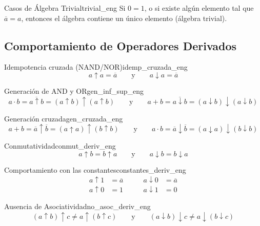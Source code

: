\setcounter{tcb@cnt@teorema}{3}
\begin{teorema}{Casos de Álgebra Trivial}{trivial_eng}
Si $0 = 1$, o si existe algún elemento tal que $\overline{a} = a$, entonces el álgebra contiene un único elemento (álgebra trivial).
\end{teorema}

\subsection*{Comportamiento de Operadores Derivados}

\setcounter{tcb@cnt@teorema}{13}
\begin{teorema}{Idempotencia cruzada (NAND/NOR)}{idemp_cruzada_eng}
\[ a \uparrow a = \overline{a} \qquad \text{y} \qquad a \downarrow a = \overline{a} \]
\end{teorema}

\setcounter{tcb@cnt@teorema}{14}
\begin{teorema}{Generación de AND y OR}{gen_inf_sup_eng}
\[ a \cdot b = \overline{a \uparrow b} = (a \uparrow b) \uparrow (a \uparrow b) \qquad \text{y} \qquad a + b = \overline{a \downarrow b} = (a \downarrow b) \downarrow (a \downarrow b) \]
\end{teorema}

\setcounter{tcb@cnt@teorema}{15}
\begin{teorema}{Generación cruzada}{gen_cruzada_eng}
\[ a + b = \overline{a} \uparrow \overline{b} = (a \uparrow a) \uparrow (b \uparrow b) \qquad \text{y} \qquad a \cdot b = \overline{a} \downarrow \overline{b} = (a \downarrow a) \downarrow (b \downarrow b) \]
\end{teorema}

\setcounter{tcb@cnt@teorema}{16}
\begin{teorema}{Conmutatividad}{conmut_deriv_eng}
\[ a \uparrow b = b \uparrow a \qquad \text{y} \qquad a \downarrow b = b \downarrow a \]
\end{teorema}

\setcounter{tcb@cnt@teorema}{18}
\begin{teorema}{Comportamiento con las constantes}{constantes_deriv_eng}
\begin{align*}
    a \uparrow 1 &= \overline{a} \qquad & a \downarrow 0 &= \overline{a} \\
    a \uparrow 0 &= 1 \qquad & a \downarrow 1 &= 0
\end{align*}
\end{teorema}

\setcounter{tcb@cnt@teorema}{19}
\begin{teorema}{Ausencia de Asociatividad}{no_asoc_deriv_eng}
\[ (a \uparrow b) \uparrow c \neq a \uparrow (b \uparrow c) \qquad \text{y} \qquad (a \downarrow b) \downarrow c \neq a \downarrow (b \downarrow c) \]
\end{teorema}

